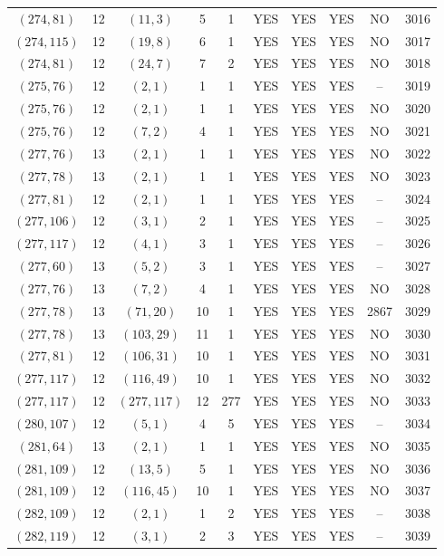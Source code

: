 \begin{longtable}{|c|c|c|c|c|c|c|c|c|c|}
$(274, 81)$ & 12 & $(11, 3)$ & 5 & 1 & YES & YES & YES & NO & 3016\\
$(274, 115)$ & 12 & $(19, 8)$ & 6 & 1 & YES & YES & YES & NO & 3017\\
$(274, 81)$ & 12 & $(24, 7)$ & 7 & 2 & YES & YES & YES & NO & 3018\\
$(275, 76)$ & 12 & $(2, 1)$ & 1 & 1 & YES & YES & YES & -- & 3019\\
$(275, 76)$ & 12 & $(2, 1)$ & 1 & 1 & YES & YES & YES & NO & 3020\\
$(275, 76)$ & 12 & $(7, 2)$ & 4 & 1 & YES & YES & YES & NO & 3021\\
$(277, 76)$ & 13 & $(2, 1)$ & 1 & 1 & YES & YES & YES & NO & 3022\\
$(277, 78)$ & 13 & $(2, 1)$ & 1 & 1 & YES & YES & YES & NO & 3023\\
$(277, 81)$ & 12 & $(2, 1)$ & 1 & 1 & YES & YES & YES & -- & 3024\\
$(277, 106)$ & 12 & $(3, 1)$ & 2 & 1 & YES & YES & YES & -- & 3025\\
$(277, 117)$ & 12 & $(4, 1)$ & 3 & 1 & YES & YES & YES & -- & 3026\\
$(277, 60)$ & 13 & $(5, 2)$ & 3 & 1 & YES & YES & YES & -- & 3027\\
$(277, 76)$ & 13 & $(7, 2)$ & 4 & 1 & YES & YES & YES & NO & 3028\\
$(277, 78)$ & 13 & $(71, 20)$ & 10 & 1 & YES & YES & YES & 2867 & 3029\\
$(277, 78)$ & 13 & $(103, 29)$ & 11 & 1 & YES & YES & YES & NO & 3030\\
$(277, 81)$ & 12 & $(106, 31)$ & 10 & 1 & YES & YES & YES & NO & 3031\\
$(277, 117)$ & 12 & $(116, 49)$ & 10 & 1 & YES & YES & YES & NO & 3032\\
$(277, 117)$ & 12 & $(277, 117)$ & 12 & 277 & YES & YES & YES & NO & 3033\\
$(280, 107)$ & 12 & $(5, 1)$ & 4 & 5 & YES & YES & YES & -- & 3034\\
$(281, 64)$ & 13 & $(2, 1)$ & 1 & 1 & YES & YES & YES & NO & 3035\\
$(281, 109)$ & 12 & $(13, 5)$ & 5 & 1 & YES & YES & YES & NO & 3036\\
$(281, 109)$ & 12 & $(116, 45)$ & 10 & 1 & YES & YES & YES & NO & 3037\\
$(282, 109)$ & 12 & $(2, 1)$ & 1 & 2 & YES & YES & YES & -- & 3038\\
$(282, 119)$ & 12 & $(3, 1)$ & 2 & 3 & YES & YES & YES & -- & 3039\\

\end{longtable}
